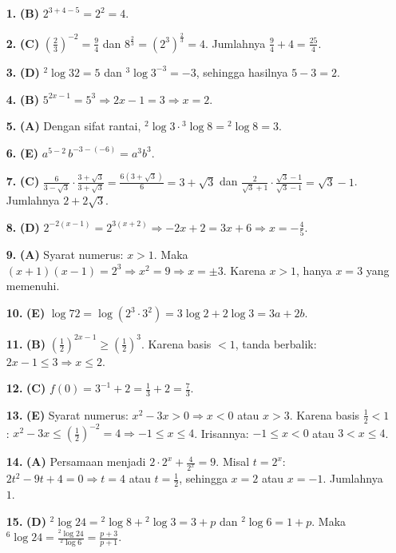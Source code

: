\documentclass[a4paper,11pt]{article}
\newcommand{\dis}{\displaystyle}
\newcommand{\alog}[2]{{}^{#1}\!\log #2}
\begin{document}
\small\begin{enumerate}[leftmargin=2em,itemsep=2pt,topsep=2pt]
\item[\textbf{1.}] \textbf{(B)} $2^{3+4-5}=2^{2}=4$.
\item[\textbf{2.}] \textbf{(C)} $\left(\dis\frac23\right)^{-2}=\dis\frac94$ dan $8^{\frac23}=(2^{3})^{\frac23}=4$. Jumlahnya $\dis\frac94+4=\dis\frac{25}{4}$.
\item[\textbf{3.}] \textbf{(D)} $\alog{2}{32}=5$ dan $\alog{3}{3^{-3}}=-3$, sehingga hasilnya $5-3=2$.
\item[\textbf{4.}] \textbf{(B)} $5^{2x-1}=5^{3}\Rightarrow 2x-1=3\Rightarrow x=2$.
\item[\textbf{5.}] \textbf{(A)} Dengan sifat rantai, $\alog{2}{3}\cdot\alog{3}{8}=\alog{2}{8}=3$.
\item[\textbf{6.}] \textbf{(E)} $a^{5-2}\,b^{-3-(-6)}=a^{3}b^{3}$.
\item[\textbf{7.}] \textbf{(C)} $\dis\frac{6}{3-\sqrt3}\cdot\dis\frac{3+\sqrt3}{3+\sqrt3}=\dis\frac{6(3+\sqrt3)}{6}=3+\sqrt3$ dan $\dis\frac{2}{\sqrt3+1}\cdot\dis\frac{\sqrt3-1}{\sqrt3-1}=\sqrt3-1$. Jumlahnya $2+2\sqrt3$.
\item[\textbf{8.}] \textbf{(D)} $2^{-2(x-1)}=2^{3(x+2)}\Rightarrow -2x+2=3x+6\Rightarrow x=-\dis\frac45$.
\item[\textbf{9.}] \textbf{(A)} Syarat numerus: $x>1$. Maka $(x+1)(x-1)=2^{3}\Rightarrow x^{2}=9\Rightarrow x=\pm3$. Karena $x>1$, hanya $x=3$ yang memenuhi.
\item[\textbf{10.}] \textbf{(E)} $\log 72=\log(2^{3}\cdot3^{2})=3\log2+2\log3=3a+2b$.
\item[\textbf{11.}] \textbf{(B)} $\left(\dis\frac12\right)^{2x-1}\ge\left(\dis\frac12\right)^{3}$. Karena basis $<1$, tanda berbalik: $2x-1\le3\Rightarrow x\le2$.
\item[\textbf{12.}] \textbf{(C)} $f(0)=3^{-1}+2=\dis\frac13+2=\dis\frac73$.
\item[\textbf{13.}] \textbf{(E)} Syarat numerus: $x^{2}-3x>0\Rightarrow x<0$ atau $x>3$. Karena basis $\dis\frac12<1$: $x^{2}-3x\le\left(\dis\frac12\right)^{-2}=4\Rightarrow-1\le x\le4$. Irisannya: $-1\le x<0$ atau $3<x\le4$.
\item[\textbf{14.}] \textbf{(A)} Persamaan menjadi $2\cdot2^{x}+\dis\frac{4}{2^{x}}=9$. Misal $t=2^{x}$: $2t^{2}-9t+4=0\Rightarrow t=4$ atau $t=\dis\frac12$, sehingga $x=2$ atau $x=-1$. Jumlahnya $1$.
\item[\textbf{15.}] \textbf{(D)} $\alog{2}{24}=\alog{2}{8}+\alog{2}{3}=3+p$ dan $\alog{2}{6}=1+p$. Maka $\alog{6}{24}=\dis\frac{\alog{2}{24}}{\alog{2}{6}}=\dis\frac{p+3}{p+1}$.

\end{enumerate}
\end{document}
